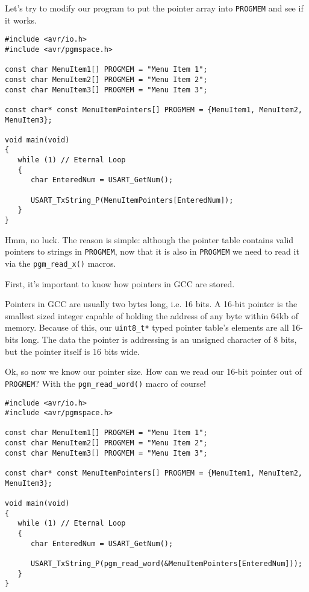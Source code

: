 \documentclass[a4paper,oneside,notitlepage]{book}
\begin{document}
Let's try to modify our program to put the pointer array into \lstinline{PROGMEM} and see if it works.

\begin{center}
\begin{lstlisting}
#include <avr/io.h>
#include <avr/pgmspace.h>

const char MenuItem1[] PROGMEM = "Menu Item 1";
const char MenuItem2[] PROGMEM = "Menu Item 2";
const char MenuItem3[] PROGMEM = "Menu Item 3";

const char* const MenuItemPointers[] PROGMEM = {MenuItem1, MenuItem2, MenuItem3};

void main(void)
{
   while (1) // Eternal Loop
   {
      char EnteredNum = USART_GetNum();

      USART_TxString_P(MenuItemPointers[EnteredNum]);
   }
}
\end{lstlisting}
\end{center}

Hmm, no luck. The reason is simple: although the pointer table contains valid pointers to strings in \lstinline{PROGMEM}, now that it is also in \lstinline{PROGMEM} we need to read it via the \lstinline{pgm_read_x()} macros.

First, it's important to know how pointers in GCC are stored.

Pointers in GCC are usually two bytes long, i.e. 16 bits. A 16-bit pointer is the smallest sized integer capable of holding the address of any byte within 64kb of memory. Because of this, our \lstinline{uint8_t*} typed pointer table's elements are all 16-bits long. The data the pointer is addressing is an unsigned character of 8 bits, but the pointer itself is 16 bits wide.

Ok, so now we know our pointer size. How can we read our 16-bit pointer out of \lstinline{PROGMEM}? With the \lstinline{pgm_read_word()} macro of course!

\begin{center}
\begin{lstlisting}
#include <avr/io.h>
#include <avr/pgmspace.h>

const char MenuItem1[] PROGMEM = "Menu Item 1";
const char MenuItem2[] PROGMEM = "Menu Item 2";
const char MenuItem3[] PROGMEM = "Menu Item 3";

const char* const MenuItemPointers[] PROGMEM = {MenuItem1, MenuItem2, MenuItem3};

void main(void)
{
   while (1) // Eternal Loop
   {
      char EnteredNum = USART_GetNum();

      USART_TxString_P(pgm_read_word(&MenuItemPointers[EnteredNum]));
   }
}
\end{lstlisting}
\end{center}
\end{document}
